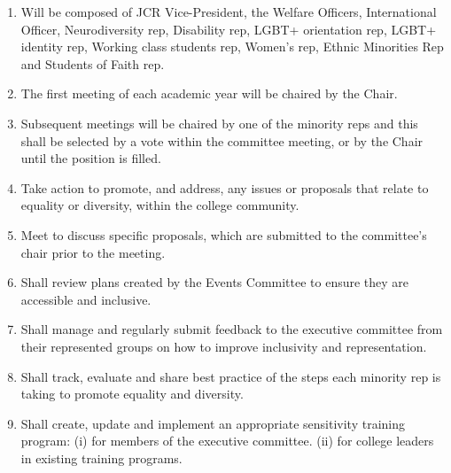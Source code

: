 
\begin{enumerate}
    \item Will be composed of JCR Vice-President, the Welfare Officers, International Officer, Neurodiversity rep, Disability rep, LGBT+ orientation rep, LGBT+ identity rep, Working class students rep, Women's rep, Ethnic Minorities Rep and Students of Faith rep.
    \item The first meeting of each academic year will be chaired by the Chair. 
    \item Subsequent meetings will be chaired by one of the minority reps and this shall be selected by a vote within the committee meeting, or by the Chair until the position is filled. 
    \item Take action to promote, and address, any issues or proposals that relate to equality or diversity, within the college community. 
    \item Meet to discuss specific proposals, which are submitted to the committee’s chair prior to the meeting.
    \item Shall review plans created by the Events Committee to ensure they are accessible and inclusive.
    \item Shall manage and regularly submit feedback to the executive committee from their represented groups on how to improve inclusivity and representation.
    \item Shall track, evaluate and share best practice of the steps each minority rep is taking to promote equality and diversity.
    \item Shall create, update and implement an appropriate sensitivity training program:
(i) for members of the executive committee. 
(ii) for college leaders in existing training programs.

\end{enumerate}


